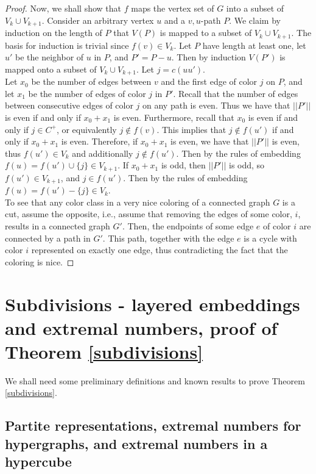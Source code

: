 \documentclass[11pt, a4paper]{article}
\begin{document}
\begin{proof}
	
	
	Now, we shall show that $f$ maps the vertex set of $G$ into a subset of  $V_k \cup V_{k+1}$.  
	Consider an arbitrary vertex $u$ and a $v,u$-path $P$.  We claim by induction on the length of $P$ that $V(P)$ is mapped to a subset of $ V_k \cup V_{k+1}$. The basis for induction is trivial since $f(v)\in V_k$.  Let $P$ have length at least one, let $u'$ be the neighbor of $u$ in $P$,  and $P'=P-u$. Then by induction $V(P')$ is mapped onto a subset of $V_k\cup V_{k+1}$.  Let $j=c(uu')$.\\
	

Let $x_0$ be the number of edges between $v$ and the first edge of color $j$ on $P$, and let $x_1$ be the number of edges of color $j$ in $P'$.
Recall that  the number of edges between consecutive edges of color $j$ on any path is even. Thus we have that $||P'||$ is even if and only if $x_0 + x_1$ is even.
Furthermore, recall that $x_0$ is even if and only if $j\in C^+$, or equivalently $j\not\in f(v)$.
This implies that $j\not\in f(u')$ if and only if $x_0+x_1$ is even.
Therefore, if $x_0 + x_1$ is even, we have that $||P'||$ is even, thus $f(u')\in V_k$ and additionally $j\not\in f(u')$. Then by the rules of embedding $f(u) = f(u') \cup \{j\} \in V_{k+1}$. 
If $x_0+x_1$ is odd, then $||P'||$ is odd, so $f(u')\in V_{k+1}$, and $j\in f(u')$. Then by the rules of embedding $f(u) = f(u') -\{j\} \in V_{k}$.\\
 	


To see that any color class in a very nice coloring of a connected graph $G$ is a cut, assume the opposite, i.e., assume that removing the edges of some color, $i$,  results in a connected graph $G'$. Then, the endpoints of some edge $e$ of color $i$ are connected by a path in $G'$. This path, together with the edge $e$ is a cycle with color $i$ represented on exactly one edge, thus contradicting the fact that the coloring is nice.
	\end{proof}


\section{Subdivisions - layered embeddings and extremal numbers, proof of Theorem \ref{subdivisions}}\label{sec:subdivisions}

We shall need some preliminary definitions and known results to prove Theorem \ref{subdivisions}.
\subsection{Partite representations, extremal numbers for hypergraphs,  and extremal numbers in a hypercube}
\end{document}
